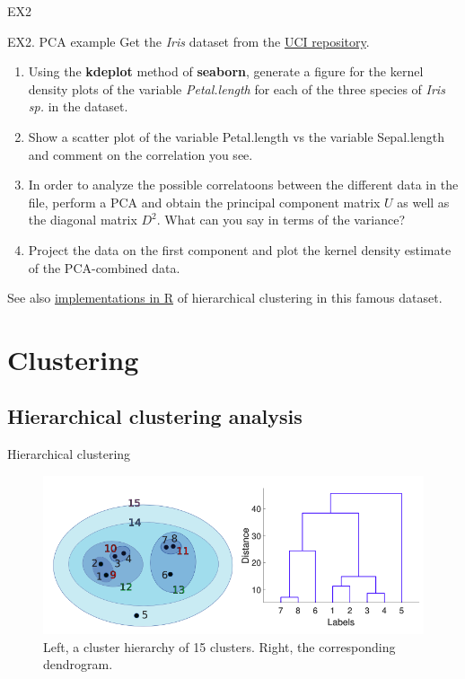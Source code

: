 \documentclass{beamer}
\begin{document}
\begin{frame}{EX2}
    \begin{Exercise}{EX2. PCA example}
        Get the {\em Iris} dataset from the \href{https://archive.ics.uci.edu}{UCI repository}. 
        \begin{enumerate}
            \item Using the {\bf kdeplot} method of {\bf seaborn}, generate a figure for the kernel density plots of the variable {\em Petal.length} for each of the three species of {\em Iris sp.} in the dataset.
            \item Show a scatter plot of the variable Petal.length vs the variable Sepal.length and comment on the correlation you see. 
            \item In order to analyze the possible correlatoons between the different data in the file, perform a PCA and obtain the principal component matrix $U$ as well as the diagonal matrix $D^2$. What can you say in terms of the variance?
            \item Project the data on the first component and plot the kernel density estimate of the PCA-combined data. 
        \end{enumerate}
        See also \href{https://cran.r-project.org/web/packages/dendextend/vignettes/Cluster_Analysis.html\#iris---edgar-andersons-iris-data}{implementations in R} of hierarchical clustering in this famous dataset.
    \end{Exercise}
\end{frame}

\section{Clustering}

\subsection{Hierarchical clustering analysis}

\begin{frame}{Hierarchical clustering}
    \begin{figure}
        \includegraphics[width=\linewidth]{HCA}
        \caption{Left, a cluster hierarchy of 15 clusters. Right, the corresponding dendrogram\cite{kroese2020}.}
    \end{figure}
\end{frame}
\end{document}
